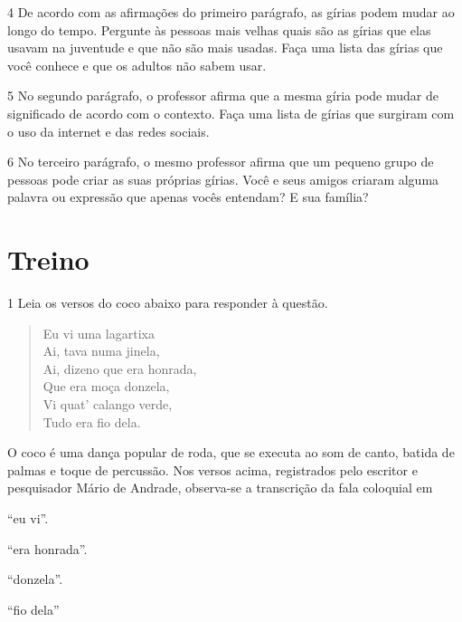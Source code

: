 \num{4} De acordo com as afirmações do primeiro parágrafo, as gírias podem
mudar ao longo do tempo. Pergunte às pessoas mais velhas quais são as 
gírias que elas usavam na juventude e que não são mais usadas. Faça uma
lista das gírias que você conhece e que os adultos não sabem usar. 

\num{5} No segundo parágrafo, o professor afirma que a mesma gíria pode
mudar de significado de acordo com o contexto. Faça uma lista de gírias
que surgiram com o uso da internet e das redes sociais.

\num{6} No terceiro parágrafo, o mesmo professor afirma que um pequeno
grupo de pessoas pode criar as suas próprias gírias. Você e seus amigos 
criaram alguma palavra ou expressão que apenas vocês entendam? E sua 
família? 

\section*{Treino}

\num{1} Leia os versos do coco abaixo para responder à questão.

\begin{myquote}
\begin{verse}

Eu vi uma lagartixa \\
Ai, tava numa jinela, \\
Ai, dizeno que era honrada, \\
Que era moça donzela, \\
Vi quat' calango verde, \\
Tudo era fio dela. 

\end{verse}


\end{myquote}

O coco é uma dança popular de roda, que se executa ao som de canto, batida de palmas e 
toque de percussão. Nos versos acima, registrados pelo escritor e pesquisador Mário de 
Andrade, observa-se a transcrição da fala coloquial em

\begin{escolha}
  
  \item ``eu vi''.
  
  \item ``era honrada''.
  
  \item ``donzela''.
  
  \item ``fio dela''

\end{escolha}

